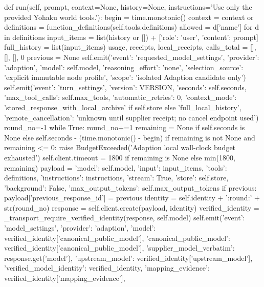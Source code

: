 {    def run(self, prompt, context=None, history=None, instructions='Use only the provided Yohaku world tools.'):
        begin = time.monotonic()
        context = context or {}
        definitions = function_definitions(self.tools.definitions)
        allowed = {d['name'] for d in definitions}
        input_items = list(history or []) + [{'role': 'user', 'content': prompt}]
        full_history = list(input_items)
        usage, receipts, local_receipts, calls_total = [], [], [], 0
        previous = None
        self.emit({'event': 'requested_model_settings', 'provider': 'adaption', 'model': self.model,
                   'reasoning_effort': 'none', 'selection_source': 'explicit immutable node profile',
                   'scope': 'isolated Adaption candidate only'})
        self.emit({'event': 'turn_settings', 'version': VERSION, 'seconds': self.seconds,
                   'max_tool_calls': self.max_tools, 'automatic_retries': 0,
                   'context_mode': 'stored_response_with_local_archive' if self.store else 'full_local_history',
                   'remote_cancellation': 'unknown until supplier receipt; no cancel endpoint used'})
        round_no=-1
        while True:
            round_no+=1
            remaining = None if self.seconds is None else self.seconds - (time.monotonic() - begin)
            if remaining is not None and remaining <= 0:
                raise BudgetExceeded('Adaption local wall-clock budget exhausted')
            self.client.timeout = 1800 if remaining is None else min(1800, remaining)
            payload = {'model': self.model, 'input': input_items, 'tools': definitions,
                       'instructions': instructions, 'stream': True, 'store': self.store,
                       'background': False, 'max_output_tokens': self.max_output_tokens}
            if previous:
                payload['previous_response_id'] = previous
            identity = self.identity + ':round:' + str(round_no)
            response = self.client.create(payload, identity)
            verified_identity = _transport_require_verified_identity(response, self.model)
            self.emit({'event': 'model_settings', 'provider': 'adaption',
                       'model': verified_identity['canonical_public_model'],
                       'canonical_public_model': verified_identity['canonical_public_model'],
                       'supplier_model_verbatim': response.get('model'),
                       'upstream_model': verified_identity['upstream_model'],
                       'verified_model_identity': verified_identity,
                       'mapping_evidence': verified_identity['mapping_evidence'],
}}
